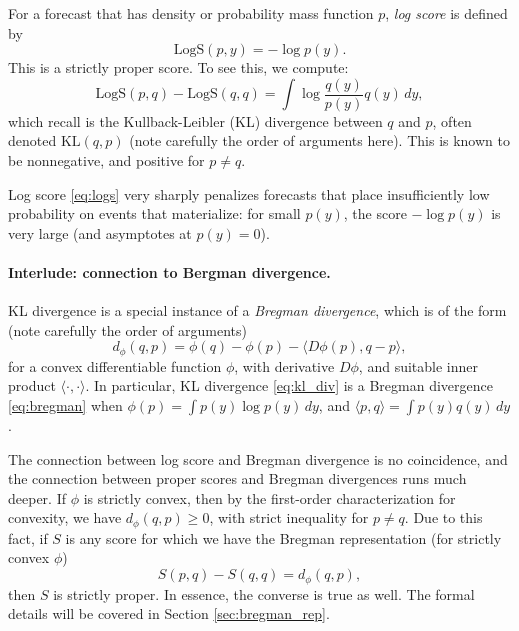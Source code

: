 \documentclass{article}
\begin{document}
\def\KL{\mathrm{KL}}

For a forecast that has density or probability mass function $p$, \emph{log
  score} is defined by 
\begin{equation}
\label{eq:logs}
\mathrm{LogS}(p, y) = -\log p(y).
\end{equation}
This is a strictly proper score. To see this, we compute:
\begin{equation}
\label{eq:kl_div}
\mathrm{LogS}(p, q) - \mathrm{LogS}(q, q) = \int \log \frac{q(y)}{p(y)} q(y) \, 
dy,
\end{equation}
which recall is the Kullback-Leibler (KL) divergence between $q$ and $p$, often
denoted $\KL(q,p)$ (note carefully the order of arguments here). This is known
to be nonnegative, and positive for $p \not= q$.

Log score \eqref{eq:logs} very sharply penalizes forecasts that place
insufficiently low probability on events that materialize: for small $p(y)$, the
score $-\log p(y)$ is very large (and asymptotes at $p(y) = 0$).  

\paragraph{Interlude: connection to Bergman divergence.}

KL divergence is a special instance of a \emph{Bregman divergence}, which is of
the form (note carefully the order of arguments)
\begin{equation}
\label{eq:bregman}
d_\phi(q,p) = \phi(q) - \phi(p) - \langle D\phi(p), q - p \rangle,
\end{equation}
for a convex differentiable function $\phi$, with derivative $D\phi$, and
suitable inner product $\langle \cdot, \cdot \rangle$. In particular, KL
divergence \eqref{eq:kl_div} is a Bregman divergence \eqref{eq:bregman} when
$\phi(p) = \int p(y) \log p(y) \, dy$, and $\langle p, q \rangle = \int p(y)
q(y) \, dy$.   

The connection between log score and Bregman divergence is no coincidence, and
the connection between proper scores and Bregman divergences runs much
deeper. If $\phi$ is strictly convex, then by the first-order characterization
for convexity, we have $d_\phi(q,p) \geq 0$, with strict inequality for $p \not= 
q$. Due to this fact, if $S$ is any score for which we have the Bregman
representation (for strictly convex $\phi$)   
\begin{equation}
\label{eq:bregman_rep}
S(p, q) - S(q, q) = d_\phi(q, p),
\end{equation}
then $S$ is strictly proper. In essence, the converse is true as well. The
formal details will be covered in Section \ref{sec:bregman_rep}. 
\end{document}

